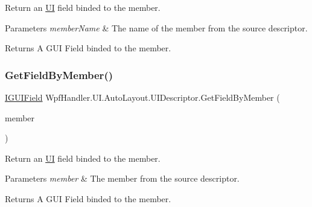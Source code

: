 Return an \mbox{\hyperlink{namespace_wpf_handler_1_1_u_i}{UI}} field binded to the member. 


\begin{DoxyParams}{Parameters}
{\em member\+Name} & The name of the member from the source descriptor.\\
\hline
\end{DoxyParams}
\begin{DoxyReturn}{Returns}
A G\+UI Field binded to the member.
\end{DoxyReturn}
\mbox{\label{class_wpf_handler_1_1_u_i_1_1_auto_layout_1_1_u_i_descriptor_ab965d93a86ca10bb9e7b30ac14fcfad8}} 
\subsubsection{\texorpdfstring{Get\+Field\+By\+Member()}{GetFieldByMember()}\hspace{0.1cm}{\footnotesize\ttfamily [2/2]}}
{\footnotesize\ttfamily \mbox{\hyperlink{interface_wpf_handler_1_1_u_i_1_1_auto_layout_1_1_i_g_u_i_field}{I\+G\+U\+I\+Field}} Wpf\+Handler.\+U\+I.\+Auto\+Layout.\+U\+I\+Descriptor.\+Get\+Field\+By\+Member (\begin{DoxyParamCaption}\item[{Member\+Info}]{member }\end{DoxyParamCaption})}



Return an \mbox{\hyperlink{namespace_wpf_handler_1_1_u_i}{UI}} field binded to the member. 


\begin{DoxyParams}{Parameters}
{\em member} & The member from the source descriptor.\\
\hline
\end{DoxyParams}
\begin{DoxyReturn}{Returns}
A G\+UI Field binded to the member.
\end{DoxyReturn}
\mbox{\label{class_wpf_handler_1_1_u_i_1_1_auto_layout_1_1_u_i_descriptor_a6dbda96f0d1b9f65fd1c61e0b8a5bb6b}} 
